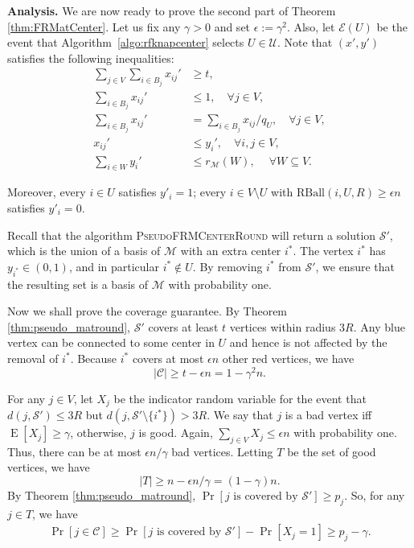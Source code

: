 \documentclass[a4paper,11pt]{article}
\DeclareMathOperator*{\E}{\mathrm{E}}
\newcommand{\C}{\mathcal{C}}
\renewcommand{\S}{\mathcal{S}}
\newcommand{\U}{\mathcal{U}}
\newcommand{\M}{\mathcal{M}}
\newcommand{\e}{\mathcal{E}}
\newcommand{\RBall}{\mathrm{RBall}}
\begin{document}
\bigskip \noindent \textbf{Analysis.} We are now ready to prove the second part of Theorem \ref{thm:FRMatCenter}. Let us fix any $\gamma > 0$ and set $\epsilon := \gamma^2$. Also, let $\e(U)$ be the event that Algorithm~\ref{algo:rfknapcenter} selects $U \in \U$. Note that $(x', y')$ satisfies the following inequalities:
\begin{align*}
	\sum_{j \in V} \sum_{i \in B_j} x_{ij}' &\geq t, \\
	\sum_{i \in B_j} x_{ij}' &\leq 1, \quad \forall j \in V, \\
	\sum_{i \in B_j} x_{ij}' &= \sum_{i \in B_j} x_{ij} / q_U, \quad  \forall j \in V, \\
	x_{ij}' &\leq y_i', \quad \forall i,j \in V, \\
	\sum_{i \in W}  y_i' &\leq  r_\M(W),    ~\quad \forall W \subseteq V.
\end{align*}

Moreover, every $i \in U$ satisfies $y'_i = 1$; every $i \in V \setminus U$ with $\RBall(i, U, R) \geq \epsilon n$ satisfies $y'_i = 0$.

Recall that the algorithm \textsc{PseudoFRMCenterRound} will return a solution $\S'$, which is the union of a basis of $\M$ with an extra center $i^*$. The vertex $i^*$ has $y_{i^*} \in (0,1)$, and in particular $i^* \notin U$. By removing $i^*$ from $\S'$, we ensure that the resulting set is a basis of $\M$ with probability one.

Now we shall prove the coverage guarantee. By Theorem \ref{thm:pseudo_matround}, $\S'$ covers at least $t$ vertices within radius $3R$. Any blue vertex can be connected to some center in $U$ and hence is not affected by the removal of $i^*$. Because $i^*$ covers at most $\epsilon n$ other red vertices, we have $$|\C| \geq t - \epsilon n = 1 - \gamma^2 n.$$

For any $j \in V$, let $X_j$ be the indicator random variable for the event that $d(j, \S') \leq 3R$ but $d(j, \S' \setminus \{i^* \} ) > 3 R$. We say that $j$ is a bad vertex iff $\E[X_j] \geq \gamma$, otherwise, $j$ is good. Again, $\sum_{j \in V} X_j \leq \epsilon n$ with probability one. Thus, there can be at most $\epsilon n / \gamma$ bad vertices. Letting $T$ be the set of good vertices, we have
$$|T| \geq n - \epsilon n/\gamma = (1-\gamma)n.$$ 
By Theorem \ref{thm:pseudo_matround}, $\Pr[j \text{ is covered by }\S'] \geq p_j$. So, for any $j \in T$, we have
\begin{align*}
	\Pr[j \in \C] \geq \Pr[j \text{ is covered by }\S'] - \Pr[X_j = 1] \geq p_j - \gamma.
\end{align*}



















\clearpage


\end{document}
